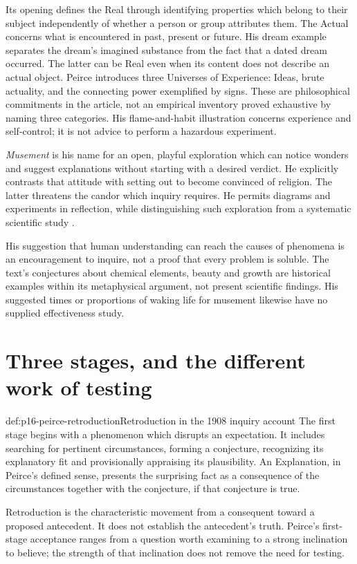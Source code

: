 Its opening defines the Real through identifying properties which belong
to their subject independently of whether a person or group attributes
them. The Actual concerns what is encountered in past, present or future.
His dream example separates the dream's imagined substance from the fact
that a dated dream occurred. The latter can be Real even when its content
does not describe an actual object. Peirce introduces
three Universes of Experience: Ideas, brute actuality, and the connecting
power exemplified by signs. These are philosophical commitments in the
article, not an empirical inventory proved exhaustive by naming three
categories. His flame-and-habit illustration concerns experience and
self-control; it is not advice to perform a hazardous experiment.

\emph{Musement} is his name for an open, playful exploration which can
notice wonders and suggest explanations without starting with a desired
verdict. He explicitly contrasts that attitude with setting out to
become convinced of religion. The latter threatens the candor which
inquiry requires. He permits diagrams and experiments in reflection,
while distinguishing such exploration from a systematic scientific
study \parencite[sec.~I]{Peirce1908NeglectedPrimary}.

His suggestion that human understanding can reach the causes of phenomena
is an encouragement to inquire, not a proof that every problem is soluble.
The text's conjectures about chemical elements, beauty and growth are
historical examples within its metaphysical argument, not present
scientific findings. His suggested times or proportions of waking life
for musement likewise have no supplied effectiveness study.

\section{Three stages, and the different work of testing}
\label{sec:p16-peirce-stages}

\begin{hbdefinition}{def:p16-peirce-retroduction}{Retroduction in the 1908 inquiry account}
The first stage begins with a phenomenon which disrupts an expectation.
It includes searching for pertinent circumstances, forming a conjecture,
recognizing its explanatory fit and provisionally appraising its
plausibility. An Explanation, in Peirce's defined sense, presents the
surprising fact as a consequence of the circumstances together with
the conjecture, if that conjecture is true.

Retroduction is the characteristic movement from a consequent toward
a proposed antecedent. It does not establish the antecedent's truth.
Peirce's first-stage acceptance ranges from a question worth examining
to a strong inclination to believe; the strength of that inclination
does not remove the need for testing.
\end{hbdefinition}

